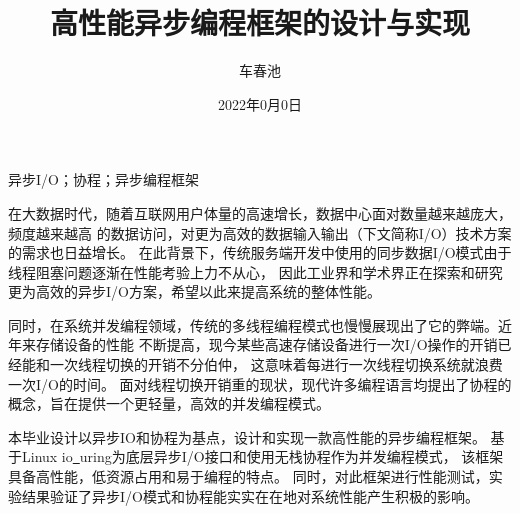 \documentclass[supercite]{HustGraduPaper}
\title{高性能异步编程框架的设计与实现}
\author{车春池}
\date{2022年0月0日}
\theoremstyle{definition}
\begin{document}
\maketitle

\statement

\clearpage


\begin{cnabstract}{异步I/O；协程；异步编程框架}

在大数据时代，随着互联网用户体量的高速增长，数据中心面对数量越来越庞大，频度越来越高
的数据访问，对更为高效的数据输入输出（下文简称I/O）技术方案的需求也日益增长。
在此背景下，传统服务端开发中使用的同步数据I/O模式由于线程阻塞问题逐渐在性能考验上力不从心，
因此工业界和学术界正在探索和研究更为高效的异步I/O方案，希望以此来提高系统的整体性能。\par

同时，在系统并发编程领域，传统的多线程编程模式也慢慢展现出了它的弊端。近年来存储设备的性能
不断提高，现今某些高速存储设备进行一次I/O操作的开销已经能和一次线程切换的开销不分伯仲，
这意味着每进行一次线程切换系统就浪费一次I/O的时间。
面对线程切换开销重的现状，现代许多编程语言均提出了协程的概念，旨在提供一个更轻量，高效的并发编程模式。\par

本毕业设计以异步IO和协程为基点，设计和实现一款高性能的异步编程框架。
基于Linux io\underline{~}uring为底层异步I/O接口和使用无栈协程作为并发编程模式，
该框架具备高性能，低资源占用和易于编程的特点。
同时，对此框架进行性能测试，实验结果验证了异步I/O模式和协程能实实在在地对系统性能产生积极的影响。

\end{cnabstract}
\end{document}
